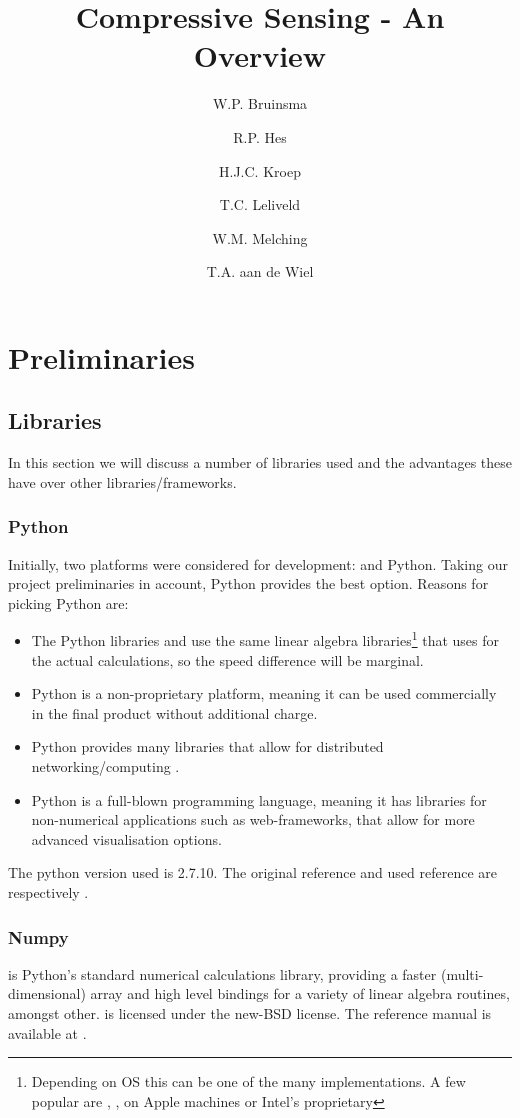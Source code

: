 \documentclass[a4paper, openany, oneside]{memoir}
\title{Compressive Sensing - An Overview}
\author{W.P. Bruinsma \and R.P. Hes \and H.J.C. Kroep \and T.C. Leliveld \and W.M. Melching \and T.A. aan de Wiel}
\begin{document}
\chapter{Preliminaries}
\section{Libraries}
\label{sec:libraries}
In this section we will discuss a number of libraries used and the advantages these have over other libraries/frameworks.

\subsection{Python}
\label{sec:python}
Initially, two platforms were considered for development: \matlab{} and Python. Taking our project preliminaries in account, Python provides the best option. Reasons for picking Python are:
\begin{itemize}
    \item The Python libraries  and  use the same linear algebra libraries\footnote{Depending on OS this can be one of the many implementations. A few popular are , ,  on Apple machines or Intel's proprietary } that \matlab{} uses for the actual calculations, so the speed difference will be marginal.
    \item Python is a non-proprietary platform, meaning it can be used commercially in the final product without additional charge.
    \item Python provides many libraries that allow for distributed networking/computing \cite{pythonmp}.
    \item Python is a full-blown programming language, meaning it has libraries for non-numerical applications such as web-frameworks, that allow for more advanced visualisation options.
\end{itemize}
The python version used is 2.7.10. The original reference and used reference are respectively \cite{Rossum:1995:PRM:869369}\cite{python2}.

\subsection{Numpy}
\label{sec:numpy}
 is Python's standard numerical calculations library, providing a faster (multi-dimensional) array and high level bindings for a variety of linear algebra routines, amongst other.  is licensed under the new-BSD license. The reference manual is available at \cite{numpyscipy}.
\end{document}
